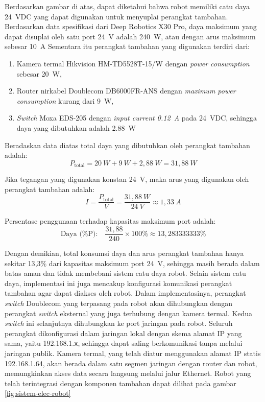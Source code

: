 Berdasarkan gambar di atas, dapat diketahui bahwa robot memiliki catu daya 24~VDC yang dapat digunakan untuk menyuplai perangkat tambahan. Berdasarkan data spesifikasi dari Deep Robotics X30 Pro, daya maksimum yang dapat disuplai oleh satu port 24~V adalah 240~W, atau dengan arus maksimum sebesar 10~A  Sementara itu perangkat tambahan yang digunakan terdiri dari:
\begin{enumerate}
  \item Kamera termal Hikvision HM-TD5528T-15/W dengan \emph{power consumption}  sebesar 20~W,
  \item Router nirkabel Doublecom DB6000FR-ANS dengan \emph{maximum power consumption} kurang dari 9~W,
  \item \emph{Switch} Moxa EDS-205  dengan \emph{input current 0.12~A} pada 24~VDC, sehingga daya yang dibutuhkan adalah 2.88~W
\end{enumerate}


Beradaskan data diatas total daya yang dibutuhkan oleh perangkat tambahan adalah:
\[
P_{\text{total}} = 20~W + 9~W + 2{,}88~W = 31{,}88~W
\]

Jika tegangan yang digunakan konstan 24~V, maka arus yang digunakan oleh perangkat tambahan adalah:
\[
I = \frac{P_{\text{total}}}{V} = \frac{31{,}88~W}{24~V} \approx 1{,}33~A
\]

Persentase penggunaan terhadap kapasitas maksimum port adalah:
\[
\text{Daya (\%P):} \quad \frac{31{,}88}{240} \times 100\% \approx 13{,}283333333\%
\]

Dengan demikian, total konsumsi daya dan arus perangkat tambahan hanya sekitar 13{,}3\% dari kapasitas maksimum port 24~V, sehingga masih berada dalam batas aman dan tidak membebani sistem catu daya robot. Selain sistem catu daya, implementasi ini juga mencakup konfigurasi komunikasi perangkat tambahan agar dapat diakses oleh robot. Dalam implementasinya, perangkat \emph{switch} Doublecom yang terpasang pada robot akan dihubungkan dengan perangkat \emph{switch} eksternal yang juga terhubung dengan kamera termal. Kedua \emph{switch} ini selanjutnya dihubungkan ke port jaringan pada robot. Seluruh perangkat dikonfigurasi dalam jaringan lokal dengan skema alamat IP yang sama, yaitu 192.168.1.\texttt{x}, sehingga dapat saling berkomunikasi tanpa melalui jaringan publik. Kamera termal, yang telah diatur menggunakan alamat IP statis 192.168.1.64, akan berada dalam satu segmen jaringan dengan router dan robot, memungkinkan akses data secara langsung melalui jalur Ethernet. Robot yang telah terintegrasi dengan komponen tambahan dapat dilihat pada gambar \ref{fig:sistem-elec-robot}


